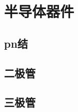 

\section{半导体器件}\label{17-6}

\subsection{pn结}\label{17-6-1}

\subsection{二极管}\label{17-6-2}

\subsection{三极管}\label{17-6-3}